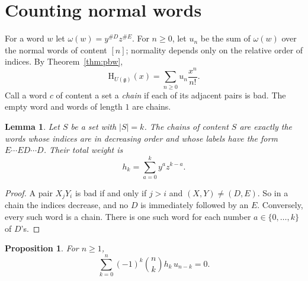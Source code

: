 \documentclass[11pt]{amsart}
\newtheorem{lemma}[theorem]{Lemma}
\newtheorem{proposition}[theorem]{Proposition}
\theoremstyle{definition}
\theoremstyle{remark}
\newcommand{\g}{\mathfrak{g}}
\newcommand{\Hs}{\mathrm{H}}
\begin{document}
\section{Counting normal words}\label{sec:count}

For a word $w$ let $\omega(w)=y^{\#D}z^{\#E}$. For $n\ge 0$, let $u_n$ be the sum of $\omega(w)$ over the normal words of content $[n]$; normality depends only on the relative order of indices. By Theorem~\ref{thm:pbw},
\[
\Hs_{U(\g)}(x)=\sum_{n\ge0}u_n\frac{x^n}{n!}.
\]
Call a word $c$ of content a set a \emph{chain} if each of its adjacent pairs is bad. The empty word and words of length $1$ are chains.

\begin{lemma}\label{lem:chain}
Let $S$ be a set with $|S|=k$. The chains of content $S$ are exactly the words whose indices are in decreasing order and whose labels have the form $E\cdots ED\cdots D$. Their total weight is
\[
h_k=\sum_{a=0}^ky^az^{k-a}.
\]
\end{lemma}

\begin{proof}
A pair $X_jY_i$ is bad if and only if $j>i$ and $(X,Y)\neq(D,E)$. So in a chain the indices decrease, and no $D$ is immediately followed by an $E$. Conversely, every such word is a chain. There is one such word for each number $a\in\{0,\dots,k\}$ of $D$'s.
\end{proof}

\begin{proposition}\label{prop:involution}
For $n\ge1$,
\[
\sum_{k=0}^n(-1)^k\binom nk h_k\,u_{n-k}=0.
\]
\end{proposition}
\end{document}
